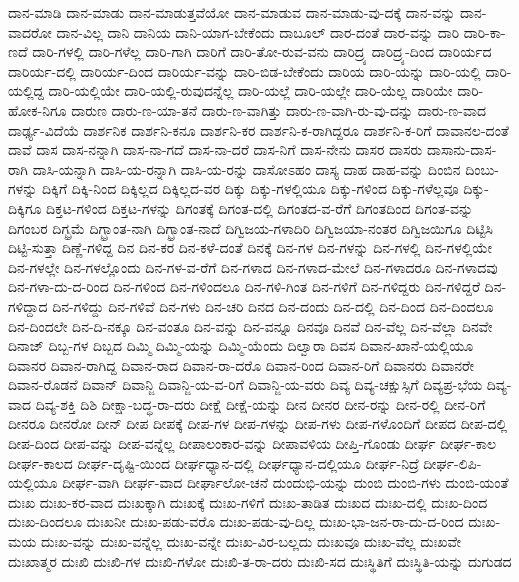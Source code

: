 {ದಾನ-ಮಾಡಿ
ದಾನ-ಮಾಡು
ದಾನ-ಮಾಡುತ್ತವೆಯೋ
ದಾನ-ಮಾಡುವ
ದಾನ-ಮಾಡು-ವು-ದಕ್ಕೆ
ದಾನ-ವನ್ನು
ದಾನ-ವಾದರೋ
ದಾನ-ವಿಲ್ಲ
ದಾನಿ
ದಾನಿಯ
ದಾನಿ-ಯಾಗ-ಬೇಕೆಂದು
ದಾಬೂಲ್
ದಾರ-ದಂತೆ
ದಾರ-ವನ್ನು
ದಾರಿ
ದಾರಿ-ಕಾ-ಣದೆ
ದಾರಿ-ಗಳಲ್ಲಿ
ದಾರಿ-ಗಳೆಲ್ಲ
ದಾರಿ-ಗಾಗಿ
ದಾರಿಗೆ
ದಾರಿ-ತೋ-ರುವ-ವನು
ದಾರಿದ್ರ್ಯ
ದಾರಿದ್ರ್ಯ-ದಿಂದ
ದಾರಿರ್ಯದ
ದಾರಿರ್ಯ-ದಲ್ಲಿ
ದಾರಿರ್ಯ-ದಿಂದ
ದಾರಿರ್ಯ-ವನ್ನು
ದಾರಿ-ಬಿಡ-ಬೇಕೆಂದು
ದಾರಿಯ
ದಾರಿ-ಯನ್ನು
ದಾರಿ-ಯಲ್ಲಿ
ದಾರಿ-ಯಲ್ಲಿದ್ದ
ದಾರಿ-ಯಲ್ಲಿಯೇ
ದಾರಿ-ಯಲ್ಲಿ-ರುವುದನ್ನೆಲ್ಲ
ದಾರಿ-ಯಲ್ಲೆ
ದಾರಿ-ಯಲ್ಲೇ
ದಾರಿ-ಯೆಲ್ಲ
ದಾರಿಯೇ
ದಾರಿ-ಹೋಕ-ನಿಗೂ
ದಾರುಣ
ದಾರು-ಣ-ಯಾ-ತನೆ
ದಾರು-ಣ-ವಾಗಿತ್ತು
ದಾರು-ಣ-ವಾಗಿ-ರು-ವು-ದನ್ನು
ದಾರು-ಣ-ವಾದ
ದಾರ್ಢ್ಯ-ವಿದೆಯೆ
ದಾರ್ಶನಿಕ
ದಾರ್ಶನಿ-ಕನೂ
ದಾರ್ಶನಿ-ಕರ
ದಾರ್ಶನಿ-ಕ-ರಾಗಿದ್ದರೂ
ದಾರ್ಶನಿ-ಕ-ರಿಗೆ
ದಾವಾನಲ-ದಂತೆ
ದಾವೆ
ದಾಸ
ದಾಸ-ನನ್ನಾಗಿ
ದಾಸ-ನಾ-ಗದೆ
ದಾಸ-ನಾ-ದರೆ
ದಾಸ-ನಿಗೆ
ದಾಸ-ನೇನು
ದಾಸರ
ದಾಸರು
ದಾಸಾನು-ದಾಸ-ರಾಗಿ
ದಾಸಿ-ಯನ್ನಾಗಿ
ದಾಸಿ-ಯ-ರನ್ನಾಗಿ
ದಾಸಿ-ಯ-ರನ್ನು
ದಾಸೋಽಹಂ
ದಾಸ್ಯ
ದಾಹ
ದಾಹ-ವನ್ನು
ದಿಂಬಿನ
ದಿಂಬು-ಗಳನ್ನು
ದಿಕ್ಕಿಗೆ
ದಿಕ್ಕಿ-ನಿಂದ
ದಿಕ್ಕಿಲ್ಲದ
ದಿಕ್ಕಿಲ್ಲದ-ವರ
ದಿಕ್ಕು
ದಿಕ್ಕು-ಗಳಲ್ಲಿಯೂ
ದಿಕ್ಕು-ಗಳಿಂದ
ದಿಕ್ಕು-ಗಳೆಲ್ಲವೂ
ದಿಕ್ಕು-ದಿಕ್ಕಿಗೂ
ದಿಕ್ತಟ-ಗಳಿಂದ
ದಿಕ್ತಟ-ಗಳನ್ನು
ದಿಗಂತಕ್ಕೆ
ದಿಗಂತ-ದಲ್ಲಿ
ದಿಗಂತದ-ವ-ರೆಗೆ
ದಿಗಂತದಿಂದ
ದಿಗಂತ-ವನ್ನು
ದಿಗಂಬರ
ದಿಗ್ಭ್ರಮೆ
ದಿಗ್ಭ್ರಾಂತ-ನಾಗಿ
ದಿಗ್ಭ್ರಾಂತ-ನಾದೆ
ದಿಗ್ವಿಜಯ-ಗಳಾದಿರಿ
ದಿಗ್ವಿಜಯಾ-ನಂತರ
ದಿಗ್ವಿಜಯಿಗೂ
ದಿಟ್ಟಿಸಿ
ದಿಟ್ಟಿ-ಸುತ್ತಾ
ದಿಣ್ಣೆ-ಗಳಿದ್ದ
ದಿನ
ದಿನ-ಕರ
ದಿನ-ಕಳೆ-ದಂತೆ
ದಿನಕ್ಕೆ
ದಿನ-ಗಳ
ದಿನ-ಗಳನ್ನು
ದಿನ-ಗಳಲ್ಲಿ
ದಿನ-ಗಳಲ್ಲಿಯೇ
ದಿನ-ಗಳಲ್ಲೇ
ದಿನ-ಗಳಲ್ಲೊಂದು
ದಿನ-ಗಳ-ವ-ರೆಗೆ
ದಿನ-ಗಳಾದ
ದಿನ-ಗಳಾದ-ಮೇಲೆ
ದಿನ-ಗಳಾದರೂ
ದಿನ-ಗಳಾದವು
ದಿನ-ಗಳಾ-ದು-ದ-ರಿಂದ
ದಿನ-ಗಳಿಂದ
ದಿನ-ಗಳಿಂದಲೂ
ದಿನ-ಗಳಿ-ಗಿಂತ
ದಿನ-ಗಳಿಗೆ
ದಿನ-ಗಳಿದ್ದರು
ದಿನ-ಗಳಿದ್ದರೆ
ದಿನ-ಗಳಿದ್ದಾದ
ದಿನ-ಗಳಿದ್ದು
ದಿನ-ಗಳಿವೆ
ದಿನ-ಗಳು
ದಿನ-ಚರಿ
ದಿನದ
ದಿನ-ದಂದು
ದಿನ-ದಲ್ಲಿ
ದಿನ-ದಿಂದ
ದಿನ-ದಿಂದಲೂ
ದಿನ-ದಿಂದಲೇ
ದಿನ-ದಿ-ನಕ್ಕೂ
ದಿನ-ವಂತೂ
ದಿನ-ವನ್ನು
ದಿನ-ವನ್ನೂ
ದಿನವೂ
ದಿನವೆ
ದಿನ-ವೆಲ್ಲ
ದಿನ-ವೆಲ್ಲಾ
ದಿನವೇ
ದಿನಾಜ್
ದಿಬ್ಬ-ಗಳ
ದಿಬ್ಬದ
ದಿಮ್ಮಿ
ದಿಮ್ಮಿ-ಯನ್ನು
ದಿಮ್ಮಿ-ಯೆಂದು
ದಿಲ್ವಾರಾ
ದಿವಸ
ದಿವಾನ-ಖಾನೆ-ಯಲ್ಲಿಯೂ
ದಿವಾನರ
ದಿವಾನ-ರಾಗಿದ್ದ
ದಿವಾನ-ರಾದ
ದಿವಾನ-ರಾ-ದರೊ
ದಿವಾನ-ರಿಂದ
ದಿವಾನ-ರಿಗೆ
ದಿವಾನರು
ದಿವಾನರೇ
ದಿವಾನ-ರೊಡನೆ
ದಿವಾನ್
ದಿವಾನ್ಜಿ
ದಿವಾನ್ಜಿ-ಯ-ವ-ರಿಗೆ
ದಿವಾನ್ಜಿ-ಯ-ವರು
ದಿವ್ಯ
ದಿವ್ಯ-ಚಕ್ಷುಸ್ಸಿಗೆ
ದಿವ್ಯಪ್ರ-ಭೆಯ
ದಿವ್ಯ-ವಾದ
ದಿವ್ಯ-ಶಕ್ತಿ
ದಿಶಿ
ದೀಕ್ಷಾ-ಬದ್ಧ-ರಾ-ದರು
ದೀಕ್ಷೆ
ದೀಕ್ಷೆ-ಯನ್ನು
ದೀನ
ದೀನರ
ದೀನ-ರನ್ನು
ದೀನ-ರಲ್ಲಿ
ದೀನ-ರಿಗೆ
ದೀನರೂ
ದೀನರೋ
ದೀನ್
ದೀಪ
ದೀಪಕ್ಕೆ
ದೀಪ-ಗಳ
ದೀಪ-ಗಳನ್ನು
ದೀಪ-ಗಳು
ದೀಪ-ಗಳೊಂದಿಗೆ
ದೀಪದ
ದೀಪ-ದಲ್ಲಿ
ದೀಪ-ದಿಂದ
ದೀಪ-ವನ್ನು
ದೀಪ-ವನ್ನೆಲ್ಲ
ದೀಪಾಲಂಕಾರ-ವನ್ನು
ದೀಪಾವಳಿಯ
ದೀಪ್ತಿ-ಗೊಂಡು
ದೀರ್ಘ
ದೀರ್ಘ-ಕಾಲ
ದೀರ್ಘ-ಕಾಲದ
ದೀರ್ಘ-ದೃಷ್ಟಿ-ಯಿಂದ
ದೀರ್ಘಧ್ಯಾನ-ದಲ್ಲಿ
ದೀರ್ಘಧ್ಯಾನ-ದಲ್ಲಿಯೂ
ದೀರ್ಘ-ನಿದ್ರೆ
ದೀರ್ಘ-ಲಿಪಿ-ಯಲ್ಲಿಯೂ
ದೀರ್ಘ-ವಾಗಿ
ದೀರ್ಘ-ವಾದ
ದೀರ್ಘಾಲೋ-ಚನೆ
ದುಂದುಭಿ-ಯನ್ನು
ದುಂಬಿ
ದುಂಬಿ-ಗಳು
ದುಂಬಿ-ಯಂತೆ
ದುಃಖ
ದುಃಖ-ಕರ-ವಾದ
ದುಃಖಕ್ಕಾಗಿ
ದುಃಖಕ್ಕೆ
ದುಃಖ-ಗಳಿಗೆ
ದುಃಖ-ತಾಡಿತ
ದುಃಖದ
ದುಃಖ-ದಲ್ಲಿ
ದುಃಖ-ದಿಂದ
ದುಃಖ-ದಿಂದಲೂ
ದುಃಖನೀ
ದುಃಖ-ಪಡು-ವರೊ
ದುಃಖ-ಪಡು-ವು-ದಿಲ್ಲ
ದುಃಖ-ಭಾ-ಜನ-ರಾ-ದು-ದ-ರಿಂದ
ದುಃಖ-ಮಯ
ದುಃಖ-ವನ್ನು
ದುಃಖ-ವನ್ನೆಲ್ಲ
ದುಃಖ-ವನ್ನೇ
ದುಃಖ-ವಿರ-ಬಲ್ಲದು
ದುಃಖವೂ
ದುಃಖ-ವೆಲ್ಲ
ದುಃಖವೇ
ದುಃಖಾತ್ಮರ
ದುಃಖಿ
ದುಃಖಿ-ಗಳ
ದುಃಖಿ-ಗಳೋ
ದುಃಖಿ-ತ-ರಾ-ದರು
ದುಃಖಿ-ಸದ
ದುಃಸ್ಥಿತಿಗೆ
ದುಃಸ್ಥಿತಿ-ಯನ್ನು
ದುಗುಡದ
}

